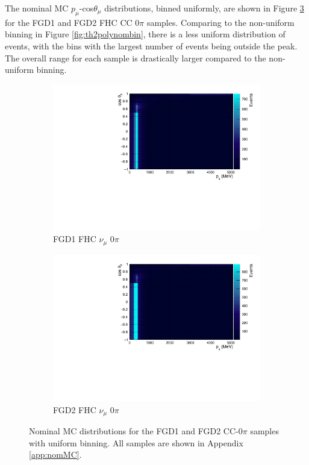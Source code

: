 The nominal MC $p_{\mu}$-cos$\theta_{\mu}$ distributions, binned uniformly, are shown in Figure \ref{fig:2dnom} for the FGD1 and FGD2 FHC CC 0$\pi$ samples. Comparing to the non-uniform binning in Figure \ref{fig:th2polynombin}, there is a less uniform distribution of events, with the bins with the largest number of events being outside the peak. The overall range for each sample is drastically larger compared to the non-uniform binning.

\begin{figure}[!htbp]
\centering
\begin{subfigure}{.7\textwidth}
  \centering
  \includegraphics[width=0.95\linewidth]{figs/NomMC_MC_FGD1_numuCC_0pi}
  \caption{FGD1 FHC $\nu_{\mu}$ 0$\pi$}
  \label{fig:2d_FGD1_numuCC_0pi}
\end{subfigure}
\begin{subfigure}{.7\textwidth}
  \centering
  \includegraphics[width=0.95\linewidth]{figs/NomMC_MC_FGD2_numuCC_0pi}
  \caption{FGD2 FHC $\nu_{\mu}$ 0$\pi$}
  \label{fig:2d_FGD2_numuCC_0pi}
\end{subfigure}
\caption{Nominal MC distributions for the FGD1 and FGD2 CC-0$\pi$ samples with uniform binning. All samples are shown in Appendix \ref{app:nomMC}.}
\label{fig:2dnom}
\end{figure}


